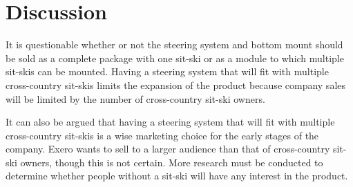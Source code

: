 \section{Discussion}
It is questionable whether or not the steering system and bottom mount should be sold as a complete package with one sit-ski or as a module to which multiple sit-skis can be mounted. Having a steering system that will fit with multiple cross-country sit-skis limits the expansion of the product because company sales will be limited by the number of cross-country sit-ski owners. 


It can also be argued that having a steering system that will fit with multiple cross-country sit-skis is a wise marketing choice for the early stages of the company. Exero wants to sell to a larger audience than that of cross-country sit-ski owners, though this is not certain. More research must be conducted to determine whether people without a sit-ski will have any interest in the product. 




